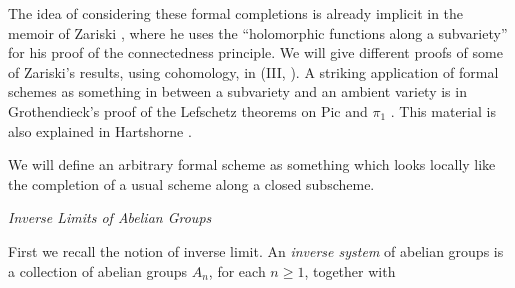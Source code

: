 {The idea of considering these formal completions is already implicit in the memoir of Zariski , where he uses the \textquotedblleft{}holomorphic functions along a subvariety\textquotedblright{} for his proof of the connectedness principle. We will give different proofs of some of Zariski's results, using cohomology, in (III, ). A striking application of formal schemes as something in between a subvariety and an ambient variety is in Grothendieck's proof of the Lefschetz theorems on Pic and $\pi_1$ . This material is also explained in Hartshorne .

We will define an arbitrary formal scheme as something which looks locally like the completion of a usual scheme along a closed subscheme.

\medskip
\noindent\emph{Inverse Limits of Abelian Groups}\par
\smallskip
\noindent First we recall the notion of inverse limit. An \emph{inverse system} of abelian groups is a collection of abelian groups $A_n$, for each $n\ge1$, together with}
